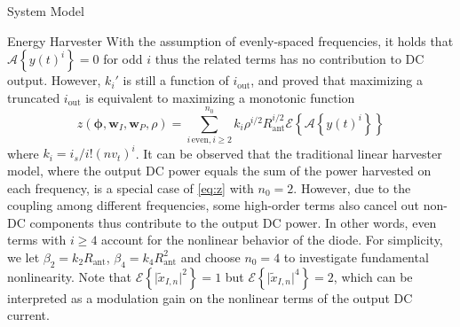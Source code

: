 \documentclass[journal]{IEEEtran}
\begin{document}
\begin{section}{System Model}
\begin{subsection}{Energy Harvester}
			With the assumption of evenly-spaced frequencies, it holds that $\mathcal{A}\left\{y(t)^i\right\}=0$ for odd $i$ thus the related terms has no contribution to DC output. However, $k_i'$ is still a function of $i_{\text{out}}$, and \cite{Clerckx2016a} proved that maximizing a truncated $i_{\text{out}}$ is equivalent to maximizing a monotonic function
			\begin{equation}\label{eq:z}
				z(\boldsymbol{\phi},\boldsymbol{w}_I,\boldsymbol{w}_P,\rho)=\sum_{i\,\text{even},i\ge2}^{n_0}{k_i}{\rho^{i/2}}{R_{\text{ant}}^{i/2}}{\mathcal{E}\left\{\mathcal{A}\left\{y(t)^i\right\}\right\}}
			\end{equation}
			where $k_i=i_s/i!(nv_t)^i$. It can be observed that the traditional linear harvester model, where the output DC power equals the sum of the power harvested on each frequency, is a special case of \ref{eq:z} with $n_0=2$. However, due to the coupling among different frequencies, some high-order terms also cancel out non-DC components thus contribute to the output DC power. In other words, even terms with $i \ge 4$ account for the nonlinear behavior of the diode. For simplicity, we let $\beta_2={k_2}{R_{\text{ant}}}$, $\beta_4={k_4}{R_{\text{ant}}^2}$ and choose $n_0=4$ to investigate fundamental nonlinearity. Note that $\mathcal{E}\left\{\lvert\tilde{x}_{I,n}\rvert^2\right\}=1$ but $\mathcal{E}\left\{\lvert\tilde{x}_{I,n}\rvert^4\right\}=2$, which can be interpreted as a modulation gain on the nonlinear terms of the output DC current.


\end{subsection}
\end{section}
\end{document}
